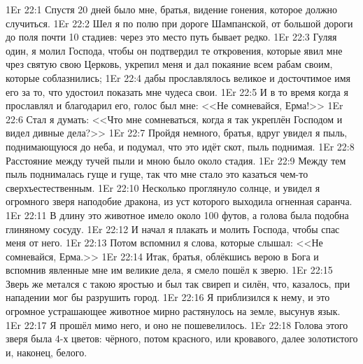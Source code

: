 \vs 1Er 22:1
Спустя 20 дней было мне, братья,
видение гонения, которое должно случиться.
\vs 1Er 22:2
Шел я по полю при дороге Шампанской,
от большой дороги до поля почти 10 стадиев:
через это место путь бывает редко.
\vs 1Er 22:3
Гуляя один, я молил
Господа, чтобы он подтвердил те откровения,
которые явил мне чрез святую свою Церковь,
укрепил меня и дал покаяние всем рабам своим,
которые соблазнились;
\vs 1Er 22:4
дабы прославлялось великое и досточтимое имя его за то,
что удостоил показать мне чудеса свои.
\vs 1Er 22:5
И в то время когда я прославлял и благодарил его, голос был мне:
<<Не сомневайся, Ерма!>>
\vs 1Er 22:6
Стал я думать:
<<Что мне сомневаться, когда я так укреплён Господом и видел дивные дела?>>
\vs 1Er 22:7
Пройдя немного, братья, вдруг увидел я пыль,
поднимающуюся до неба, и подумал, что это идёт скот,
пыль поднимая.
\vs 1Er 22:8
Расстояние между тучей пыли и мною было около стадия.
\vs 1Er 22:9
Между тем пыль поднималась гуще и гуще,
так что мне стало это казаться чем-то сверхъестественным.
\vs 1Er 22:10
Несколько проглянуло солнце, и увидел я огромного зверя
наподобие дракона, из уст которого выходила огненная саранча.
\vs 1Er 22:11
В длину это животное имело около 100 футов,
а голова была подобна глиняному сосуду.
\vs 1Er 22:12
И начал я плакать и молить Господа, чтобы спас меня от него.
\vs 1Er 22:13
Потом вспомнил я слова, которые слышал:
<<Не сомневайся, Ерма.>>
\vs 1Er 22:14
Итак, братья, облёкшись верою в Бога и вспомнив явленные
мне им великие дела, я смело пошёл к зверю.
\vs 1Er 22:15
Зверь же метался с такою яростью и был так свиреп и силён,
что, казалось, при нападении мог бы разрушить город.
\vs 1Er 22:16
Я приблизился к нему,
и это огромное устрашающее животное мирно
растянулось на земле, высунув язык.
\vs 1Er 22:17
Я прошёл мимо него, и оно не пошевелилось.
\vs 1Er 22:18
Голова этого зверя была 4-х цветов:
чёрного, потом красного, или кровавого,
далее золотистого и, наконец, белого.

